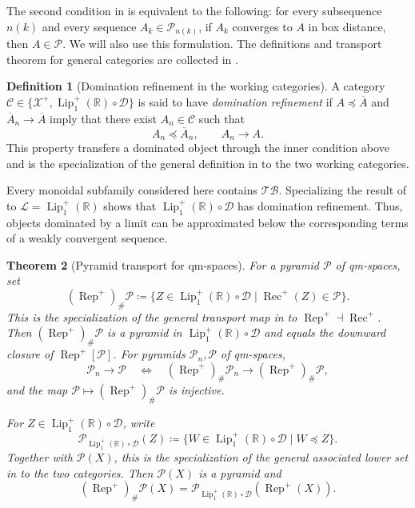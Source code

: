 \documentclass{amsart}
\theoremstyle{plain}
\newtheorem{theorem}{Theorem}[section]
\theoremstyle{definition}
\newtheorem{definition}[theorem]{Definition}
\theoremstyle{remark}
\newcommand{\R}{\mathbb{R}}
\newcommand{\D}{\mathcal{D}}
\newcommand{\Xp}{\mathcal{X}^{+}}
\renewcommand{\L}{\mathcal{L}}
\newcommand{\TB}{\mathcal{TB}}
\newcommand{\Lup}{\operatorname{Lip}^{+}_{1}(\R)}
\begin{document}
The second condition in  is equivalent to the following: for every subsequence $n(k)$ and every sequence $A_k\in\mathcal P_{n(k)}$, if $A_k$ converges to $A$ in box distance, then $A\in\mathcal P$. We will also use this formulation. The definitions and transport theorem for general categories are collected in .

\begin{definition}[Domination refinement in the working categories]
\label{def:working-category-domination-refinement}
A category $\mathcal C\in\{\Xp,\Lup\circ\D\}$ is said to have \emph{domination refinement} if $A\preceq\overline A$ and $\overline A_n\to\overline A$ imply that there exist $A_n\in\mathcal C$ such that
\[A_n\preceq\overline A_n,\qquad A_n\longrightarrow A.\]
This property transfers a dominated object through the inner condition above and is the specialization of the general definition in  to the two working categories.
\end{definition}

Every monoidal subfamily considered here contains $\TB$. Specializing the result of \cite[Lemma~5.4]{gds2} to $\L=\Lup$ shows that $\Lup\circ\D$ has domination refinement. Thus, objects dominated by a limit can be approximated below the corresponding terms of a weakly convergent sequence.

\begin{theorem}[Pyramid transport for qm-spaces]
\label{thm:qm-pyramid-transport}
For a pyramid $\mathcal P$ of qm-spaces, set
\begin{equation}
\label{eq:dplus-pyramid}
(\operatorname{Rep}^{+})_{\#}\mathcal P
\coloneqq\{Z\in\Lup\circ\D\mid\operatorname{Rec}^{+}(Z)\in\mathcal P\}.
\end{equation}
This is the specialization of the general transport map in  to $\operatorname{Rep}^{+}\dashv\operatorname{Rec}^{+}$. Then $(\operatorname{Rep}^{+})_{\#}\mathcal P$ is a pyramid in $\Lup\circ\D$ and equals the downward closure of $\operatorname{Rep}^{+}[\mathcal P]$. For pyramids $\mathcal P_n,\mathcal P$ of qm-spaces,
\[
\mathcal P_n\longrightarrow\mathcal P
\quad\Longleftrightarrow\quad
(\operatorname{Rep}^{+})_{\#}\mathcal P_n\longrightarrow(\operatorname{Rep}^{+})_{\#}\mathcal P,
\]
and the map $\mathcal P\mapsto(\operatorname{Rep}^{+})_{\#}\mathcal P$ is injective.

For $Z\in\Lup\circ\D$, write
\[\mathcal P_{\Lup\circ\D}(Z)\coloneqq\{W\in\Lup\circ\D\mid W\preceq Z\}.\]
Together with $\mathcal P(X)$, this is the specialization of the general associated lower set in  to the two categories. Then $\mathcal P(X)$ is a pyramid and
\begin{equation}
\label{eq:qm-associated-pyramid-pullback}
(\operatorname{Rep}^{+})_{\#}\mathcal P(X)
=\mathcal P_{\Lup\circ\D}(\operatorname{Rep}^{+}(X)).
\end{equation}
\end{theorem}
\end{document}
